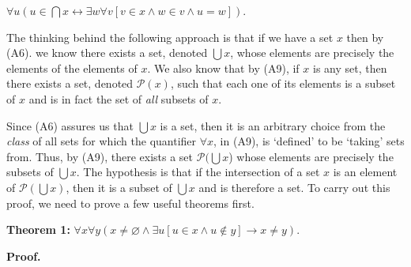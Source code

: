\documentclass[12pt, a4paper]{article}
\begin{document}
\vspace{4mm}

\centerline{$\forall u(u\in\bigcap x\leftrightarrow \exists w\forall v[v\in x\wedge w\in v\wedge u=w])$.}

\vspace{4mm}

\noindent The thinking behind the following approach is that if we have a set $x$ then by (A6). we know there exists a set, denoted $\bigcup x$, whose elements are precisely the elements of the elements of $x$. We also know that by (A9), if $x$ is any set, then there exists a set, denoted $\mathcal{P}(x)$, such that each one of its elements is a subset of $x$ and is in fact the set of \textit{all} subsets of $x$.\par

Since (A6) assures us that $\bigcup x$ is a set, then it is an arbitrary choice from the \textit{class} of all sets for which the quantifier $\forall x$, in (A9), is `defined' to be `taking' sets from. Thus, by (A9), there exists a set $\mathcal{P}(\bigcup x$) whose elements are precisely the subsets of $\bigcup x$. The hypothesis is that if the intersection of a set $x$ is an element of $\mathcal{P}(\bigcup x)$, then it is a subset of $\bigcup x$ and is therefore a set.  To carry out this proof, we need to prove a few useful theorems first.\par

\vspace{4mm}

\newpage

\noindent\textbf{Theorem 1: }$\forall x\forall y(x\neq\varnothing\wedge\exists u[u\in x\wedge u\notin y]\rightarrow x\neq y)$.

\vspace{4mm}

\noindent\textbf{Proof. }
\end{document}
